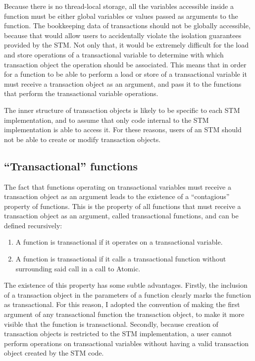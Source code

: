 \documentclass[12pt,a4paper,oneside,openright]{report}
\begin{document}
Because there is no thread-local storage, all the variables accessible
inside a function must be either global variables or values passed as
arguments to the function. The bookkeeping data of transactions should
not be globally accessible, because that would allow users to
accidentally violate the isolation guarantees provided by the STM. Not
only that, it would be extremely difficult for the load and store
operations of a transactional variable to determine with which
transaction object the operation should be associated. This means that
in order for a function to be able to perform a load or store of a
transactional variable it must receive a transaction object as an
argument, and pass it to the functions that perform the transactional
variable operations.

The inner structure of transaction objects is likely to be specific to
each STM implementation, and to assume that only code internal to the
STM implementation is able to access it. For these reasons, users of
an STM should not be able to create or modify transaction objects.

\subsection{``Transactional'' functions}
\label{sec:trans-funct}

The fact that functions operating on transactional variables must
receive a transaction object as an argument leads to the existence of
a ``contagious'' property of functions. This is the property of all
functions that must receive a transaction object as an argument,
called transactional functions, and can be defined recursively:

\begin{enumerate}
\item A function is transactional if it operates on a transactional
  variable.
\item A function is transactional if it calls a transactional function
  without surrounding said call in a call to Atomic.
\end{enumerate}

The existence of this property has some subtle advantages. Firstly,
the inclusion of a transaction object in the parameters of a function
clearly marks the function as transactional. For this reason, I
adopted the convention of making the first argument of any
transactional function the transaction object, to make it more visible
that the function is transactional. Secondly, because creation of
transaction objects is restricted to the STM implementation, a user
cannot perform operations on transactional variables without having a
valid transaction object created by the STM code.
\end{document}
